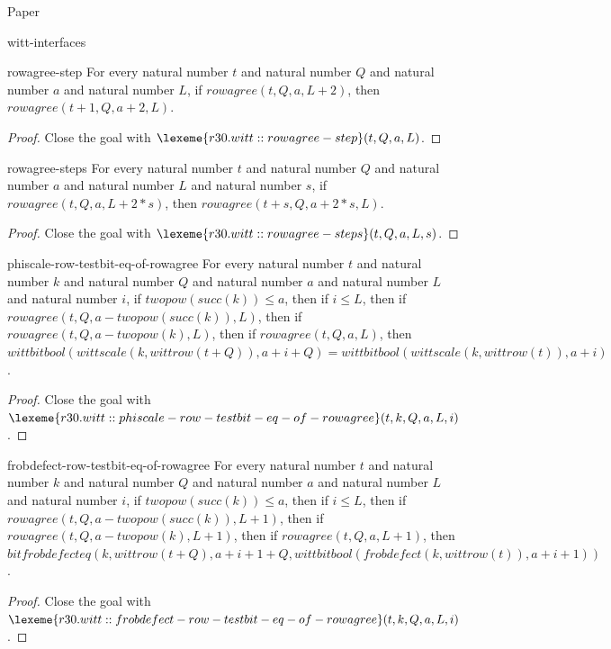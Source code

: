 \begin{lexlean}{Paper}
\begin{section}{witt-interfaces}
  \begin{theorem}{rowagree-step}
  For every natural number \(t\) and natural number \(Q\) and natural number \(a\) and natural number \(L\), if \(rowagree(t, Q, a, L + 2)\), then \(rowagree(t + 1, Q, a + 2, L)\).
  \begin{proof}
  Close the goal with \(\lexeme{r30.witt::rowagree-step}(t, Q, a, L)\).
  \end{proof}
  \end{theorem}

  \begin{theorem}{rowagree-steps}
  For every natural number \(t\) and natural number \(Q\) and natural number \(a\) and natural number \(L\) and natural number \(s\), if \(rowagree(t, Q, a, L + 2 * s)\), then \(rowagree(t + s, Q, a + 2 * s, L)\).
  \begin{proof}
  Close the goal with \(\lexeme{r30.witt::rowagree-steps}(t, Q, a, L, s)\).
  \end{proof}
  \end{theorem}

  \begin{theorem}{phiscale-row-testbit-eq-of-rowagree}
  For every natural number \(t\) and natural number \(k\) and natural number \(Q\) and natural number \(a\) and natural number \(L\) and natural number \(i\), if \(twopow(succ(k)) ≤ a\), then if \(i ≤ L\), then if \(rowagree(t, Q, a - twopow(succ(k)), L)\), then if \(rowagree(t, Q, a - twopow(k), L)\), then if \(rowagree(t, Q, a, L)\), then \(wittbitbool(wittscale(k, wittrow(t + Q)), a + i + Q) = wittbitbool(wittscale(k, wittrow(t)), a + i)\).
  \begin{proof}
  Close the goal with \(\lexeme{r30.witt::phiscale-row-testbit-eq-of-rowagree}(t, k, Q, a, L, i)\).
  \end{proof}
  \end{theorem}

  \begin{theorem}{frobdefect-row-testbit-eq-of-rowagree}
  For every natural number \(t\) and natural number \(k\) and natural number \(Q\) and natural number \(a\) and natural number \(L\) and natural number \(i\), if \(twopow(succ(k)) ≤ a\), then if \(i ≤ L\), then if \(rowagree(t, Q, a - twopow(succ(k)), L + 1)\), then if \(rowagree(t, Q, a - twopow(k), L + 1)\), then if \(rowagree(t, Q, a, L + 1)\), then \(bitfrobdefecteq(k, wittrow(t + Q), a + i + 1 + Q, wittbitbool(frobdefect(k, wittrow(t)), a + i + 1))\).
  \begin{proof}
  Close the goal with \(\lexeme{r30.witt::frobdefect-row-testbit-eq-of-rowagree}(t, k, Q, a, L, i)\).
  \end{proof}
  \end{theorem}


\end{section}
\end{lexlean}
